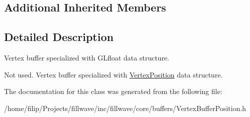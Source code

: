 \subsection*{Additional Inherited Members}


\subsection{Detailed Description}
Vertex buffer specialized with G\+Lfloat data structure. 

Not used. Vertex buffer specialized with \hyperlink{structfillwave_1_1core_1_1VertexPosition}{Vertex\+Position} data structure. 

The documentation for this class was generated from the following file\+:\begin{DoxyCompactItemize}
\item 
/home/filip/\+Projects/fillwave/inc/fillwave/core/buffers/Vertex\+Buffer\+Position.\+h\end{DoxyCompactItemize}
